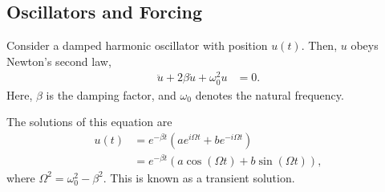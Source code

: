 \documentclass[10pt]{mypackage}
\begin{document}
  \subsection{Oscillators and Forcing}%
  Consider a damped harmonic oscillator with position $u(t)$. Then, $u$ obeys Newton's second law,
  \begin{align*}
    \ddot{u} + 2\beta\dot{u} + \omega_0^2u &= 0.
  \end{align*}
  Here, $\beta$ is the damping factor, and $\omega_{0}$ denotes the natural frequency.\newline

  The solutions of this equation are
  \begin{align*}
    u(t) &= e^{-\beta t}\left( ae^{i\Omega t} + be^{-i\Omega t} \right)\\
         &= e^{-\beta t}\left( a\cos\left( \Omega t \right) + b\sin\left( \Omega t \right) \right),
  \end{align*}
  where $\Omega^2 = \omega_0^2 - \beta^2$. This is known as a transient solution.\newline
\end{document}
